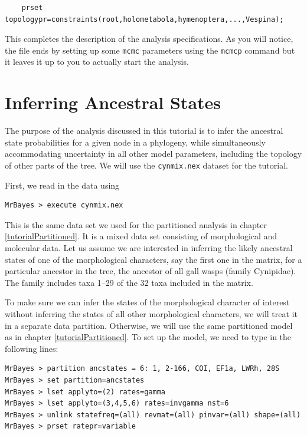 \documentclass[12pt]{book}
\newcommand{\ttt}[1]{\texttt{#1}}
\begin{document}
\footnotesize
\begin{verbatim}
    prset topologypr=constraints(root,holometabola,hymenoptera,...,Vespina);
\end{verbatim}
\normalsize

This completes the description of the analysis specifications. As you will notice, the file ends by
setting up some \ttt{mcmc} parameters using the \ttt{mcmcp} command but it leaves it up to you to
actually start the analysis.

\section{Inferring Ancestral States}

The purpose of the analysis discussed in this tutorial is to infer the ancestral state
probabilities for a given node in a phylogeny, while simultaneously accommodating uncertainty in
all other model parameters, including the topology of other parts of the tree. We will use the
\ttt{cynmix.nex} dataset for the tutorial.

First, we read in the data using

\begin{verbatim}
MrBayes > execute cynmix.nex
\end{verbatim}

This is the same data set we used for the partitioned analysis in chapter
\ref{tutorialPartitioned}. It is a mixed data set consisting of morphological and molecular data.
Let us assume we are interested in inferring the likely ancestral states of one of the
morphological characters, say the first one in the matrix, for a particular ancestor in the tree,
the ancestor of all gall wasps (family Cynipidae). The family includes taxa 1--29 of the 32 taxa
included in the matrix.

To make sure we can infer the states of the morphological character of interest without inferring
the states of all other morphological characters, we will treat it in a separate data partition.
Otherwise, we will use the same partitioned model as in chapter \ref{tutorialPartitioned}. To set
up the model, we need to type in the following lines:

\footnotesize
\begin{singlespacing}
\begin{verbatim}
MrBayes > partition ancstates = 6: 1, 2-166, COI, EF1a, LWRh, 28S
MrBayes > set partition=ancstates
MrBayes > lset applyto=(2) rates=gamma
MrBayes > lset applyto=(3,4,5,6) rates=invgamma nst=6
MrBayes > unlink statefreq=(all) revmat=(all) pinvar=(all) shape=(all)
MrBayes > prset ratepr=variable
\end{verbatim}
\end{singlespacing}
\normalsize
\end{document}
